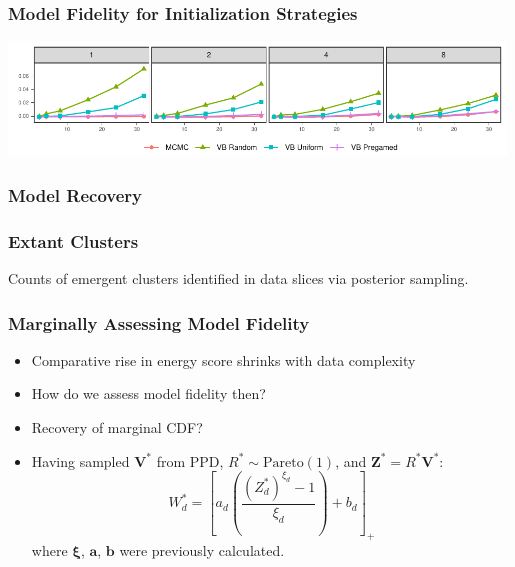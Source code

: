 \documentclass[aspectratio=169,10pt]{beamer}
\begin{document}
\begin{frame}
    \frametitle{Model Fidelity for Initialization Strategies}
    \begin{center}
    \includegraphics[width = 0.99\textwidth]{./ch3/plots/energy_score}
    \end{center}
\end{frame} %

\subsubsection{Model Recovery}

\begin{frame}
    \frametitle{Extant Clusters}
    \begin{center}
        
    \end{center}
    {\footnotesize Counts of emergent clusters identified in data slices via posterior sampling.}
\end{frame} %

\begin{frame}
    \frametitle{Marginally Assessing Model Fidelity}
    \begin{itemize}
        \item Comparative rise in energy score shrinks with data complexity
        \item How do we assess model fidelity then?
        \item Recovery of marginal CDF?
        \item Having sampled $\bm{V}^*$ from PPD, $R^*\sim\text{Pareto}(1)$, and $\bm{Z}^* = R^*\bm{V}^*$:
        \[
             W_d^* = \left[a_d\left(\frac{(Z_d^*)^{\xi_d} - 1}{\xi_d}\right) + b_d\right]_+
        \]
        where $\bm{\xi}$, $\bm{a}$, $\bm{b}$ were previously calculated.
    \end{itemize}
\end{frame} %
\end{document}
